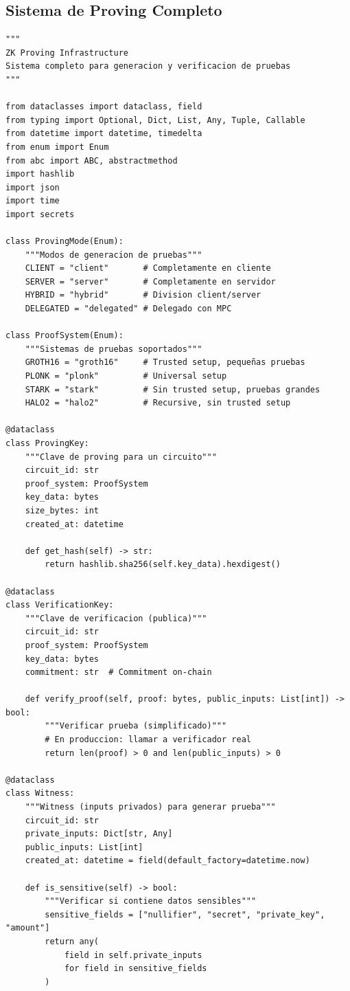 \documentclass[11pt,a4paper,twoside]{book}
\theoremstyle{definition}
\theoremstyle{remark}
\begin{document}
\subsection{Sistema de Proving Completo}

\begin{lstlisting}[style=python, caption={Infraestructura de proving ZK}]
"""
ZK Proving Infrastructure
Sistema completo para generacion y verificacion de pruebas
"""

from dataclasses import dataclass, field
from typing import Optional, Dict, List, Any, Tuple, Callable
from datetime import datetime, timedelta
from enum import Enum
from abc import ABC, abstractmethod
import hashlib
import json
import time
import secrets

class ProvingMode(Enum):
    """Modos de generacion de pruebas"""
    CLIENT = "client"       # Completamente en cliente
    SERVER = "server"       # Completamente en servidor
    HYBRID = "hybrid"       # Division client/server
    DELEGATED = "delegated" # Delegado con MPC

class ProofSystem(Enum):
    """Sistemas de pruebas soportados"""
    GROTH16 = "groth16"     # Trusted setup, pequeñas pruebas
    PLONK = "plonk"         # Universal setup
    STARK = "stark"         # Sin trusted setup, pruebas grandes
    HALO2 = "halo2"         # Recursive, sin trusted setup

@dataclass
class ProvingKey:
    """Clave de proving para un circuito"""
    circuit_id: str
    proof_system: ProofSystem
    key_data: bytes
    size_bytes: int
    created_at: datetime
    
    def get_hash(self) -> str:
        return hashlib.sha256(self.key_data).hexdigest()

@dataclass
class VerificationKey:
    """Clave de verificacion (publica)"""
    circuit_id: str
    proof_system: ProofSystem
    key_data: bytes
    commitment: str  # Commitment on-chain
    
    def verify_proof(self, proof: bytes, public_inputs: List[int]) -> bool:
        """Verificar prueba (simplificado)"""
        # En produccion: llamar a verificador real
        return len(proof) > 0 and len(public_inputs) > 0

@dataclass
class Witness:
    """Witness (inputs privados) para generar prueba"""
    circuit_id: str
    private_inputs: Dict[str, Any]
    public_inputs: List[int]
    created_at: datetime = field(default_factory=datetime.now)
    
    def is_sensitive(self) -> bool:
        """Verificar si contiene datos sensibles"""
        sensitive_fields = ["nullifier", "secret", "private_key", "amount"]
        return any(
            field in self.private_inputs
            for field in sensitive_fields
        )
    

\end{lstlisting}
\end{document}
